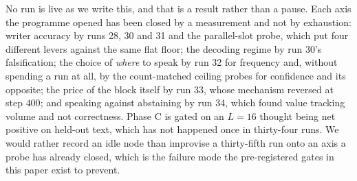 \documentclass{article} %
\begin{document}
No run is live as we write this, and that is a result rather than a pause. Each axis the programme opened has been closed by a measurement and not by exhaustion: writer accuracy by runs 28, 30 and 31 and the parallel-slot probe, which put four different levers against the same flat floor; the decoding regime by run 30's falsification; the choice of \emph{where} to speak by run 32 for frequency and, without spending a run at all, by the count-matched ceiling probes for confidence and its opposite; the price of the block itself by run 33, whose mechanism reversed at step $400$; and speaking against abstaining by run 34, which found value tracking volume and not correctness. Phase C is gated on an $L{=}16$ thought being net positive on held-out text, which has not happened once in thirty-four runs. We would rather record an idle node than improvise a thirty-fifth run onto an axis a probe has already closed, which is the failure mode the pre-registered gates in this paper exist to prevent.
\end{document}
